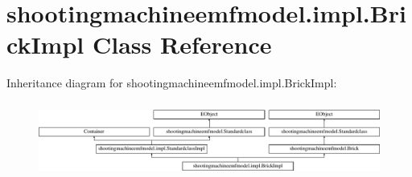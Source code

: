 \hypertarget{classshootingmachineemfmodel_1_1impl_1_1_brick_impl}{\section{shootingmachineemfmodel.\-impl.\-Brick\-Impl Class Reference}
\label{classshootingmachineemfmodel_1_1impl_1_1_brick_impl}
}
Inheritance diagram for shootingmachineemfmodel.\-impl.\-Brick\-Impl\-:\begin{figure}[H]
\begin{center}
\leavevmode
\includegraphics[height=2.497213cm]{classshootingmachineemfmodel_1_1impl_1_1_brick_impl}
\end{center}
\end{figure}
